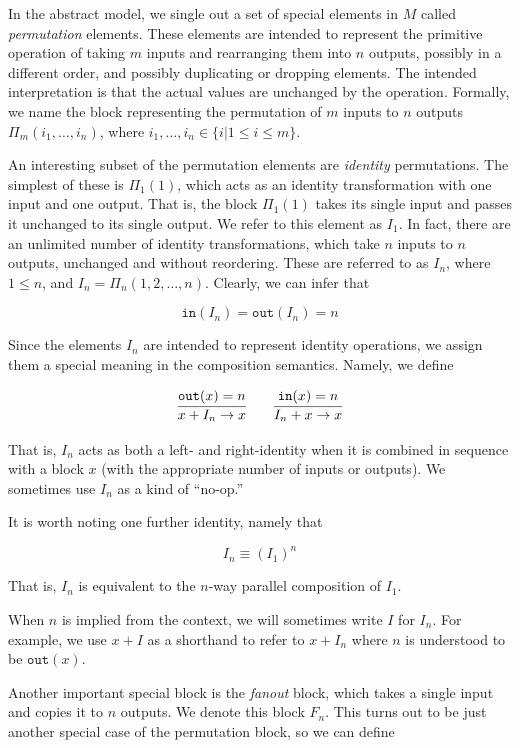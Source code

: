 In the abstract model, we single out a set of special elements in $M$ called \emph{permutation} elements. These elements are intended to represent the primitive operation of taking $m$ inputs and rearranging them into $n$ outputs, possibly in a different order, and possibly duplicating or dropping elements. The intended interpretation is that the actual values are unchanged by the operation. Formally, we name the block representing the permutation of $m$ inputs to $n$ outputs $\Pi_m(i_1,\ldots,i_n)$, where $i_1,\ldots,i_n \in \lbrace i | 1 \leq i \leq m \rbrace$.

An interesting subset of the permutation elements are \emph{identity} permutations. The simplest of these is $\Pi_1(1)$, which acts as an identity transformation with one input and one output. That is, the block $\Pi_1(1)$ takes its single input and passes it unchanged to its single output. We refer to this element as $I_1$. In fact, there are an unlimited number of identity transformations, which take $n$ inputs to $n$ outputs, unchanged and without reordering. These are referred to as $I_n$, where $1 \leq n$, and $I_n = \Pi_n(1,2,\ldots,n)$. Clearly, we can infer that

\[
\mathtt{in}(I_n) = \mathtt{out}(I_n) = n
\]

Since the elements $I_n$ are intended to represent identity operations, we assign them a special meaning in the composition semantics. Namely, we define

\[
\infer
  {x + I_n \to x}
  {\mathtt{out}(x) = n}
\qquad
\infer
  {I_n + x \to x}
  {\mathtt{in}(x) = n}
\]

That is, $I_n$ acts as both a left- and right-identity when it is combined in sequence with a block $x$ (with the appropriate number of inputs or outputs). We sometimes use $I_n$ as a kind of ``no-op.''

It is worth noting one further identity, namely that

\[
I_n \equiv (I_1)^n
\]

That is, $I_n$ is equivalent to the $n$-way parallel composition of $I_1$.

When $n$ is implied from the context, we will sometimes write $I$ for $I_n$. For example, we use $x+I$ as a shorthand to refer to $x+I_n$ where $n$ is understood to be $\mathtt{out}(x)$.

Another important special block is the \emph{fanout} block, which takes a single input and copies it to $n$ outputs. We denote this block $F_n$. This turns out to be just another special case of the permutation block, so we can define 

